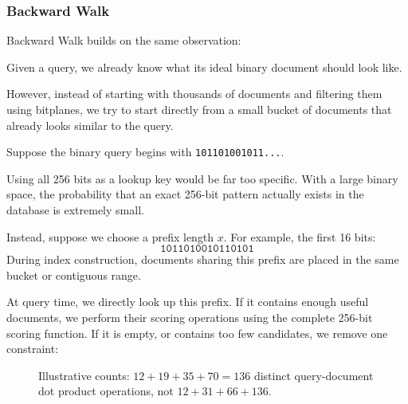 \subsubsection{Backward Walk}
Backward Walk builds on the same observation:

Given a query, we already know what its ideal binary document should look like.

However, instead of starting with thousands of documents and filtering them using bitplanes,
we try to start directly from a small bucket of documents that already looks similar to the query.

Suppose the binary query begins with \texttt{101101001011...}.

Using all 256 bits as a lookup key would be far too specific. With a large binary space,
the probability that an exact 256-bit pattern actually exists in the database is extremely small.

Instead, suppose we choose a prefix length $x$. For example, the first 16 bits:
\[
\texttt{1011010010110101}
\]
During index construction, documents sharing this prefix are placed in the same bucket or
contiguous range.

At query time, we directly look up this prefix. If it contains enough useful documents, we
perform their scoring operations using the complete 256-bit scoring function. If it is empty, or contains too few candidates,
we remove one constraint:

\begin{figure}[H]\centering
{}
\caption{Illustrative counts: $12+19+35+70=136$ distinct query-document dot product operations, not $12+31+66+136$.}
\end{figure}


